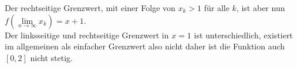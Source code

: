 \begin{enumerate}[(i)]
\begin{enumerate}[a)]
			Der rechtseitige Grenzwert, mit einer Folge von $x_k > 1$ für alle $k$, ist aber nun 
			$f ( \underset{n \rightarrow \infty}{\lim} x_k ) = x +1$.\\

			Der linksseitige und rechtseitige Grenzwert in $x=1$ ist unterschiedlich, existiert im allgemeinen als einfacher Grenzwert also nicht
			daher ist die Funktion auch $[0,2]$ nicht stetig.
	\end{enumerate}
\end{enumerate}
